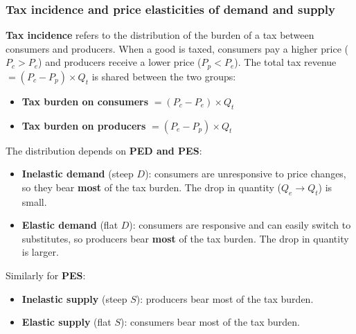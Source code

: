 \subsubsection*{Tax incidence and price elasticities of demand and supply}
\textbf{Tax incidence} refers to the distribution of the burden of a tax between consumers and producers. When a good is taxed, consumers pay a higher price ($P_c > P_e$) and producers receive a lower price ($P_p < P_e$). The total tax revenue $= (P_c - P_p) \times Q_t$ is shared between the two groups:
\begin{itemize}
  \item \textbf{Tax burden on consumers} $= (P_c - P_e) \times Q_t$
  \item \textbf{Tax burden on producers} $= (P_e - P_p) \times Q_t$
\end{itemize}
The distribution depends on \textbf{PED and PES}:
\begin{itemize}
  \item \textbf{Inelastic demand} (steep $D$): consumers are unresponsive to price changes, so they bear \textbf{most} of the tax burden. The drop in quantity ($Q_e \to Q_t$) is small.
  \item \textbf{Elastic demand} (flat $D$): consumers are responsive and can easily switch to substitutes, so producers bear \textbf{most} of the tax burden. The drop in quantity is larger.
\end{itemize}
Similarly for \textbf{PES}:
\begin{itemize}
  \item \textbf{Inelastic supply} (steep $S$): producers bear most of the tax burden.
  \item \textbf{Elastic supply} (flat $S$): consumers bear most of the tax burden.
\end{itemize}

